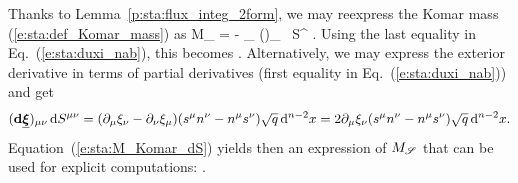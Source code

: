 Thanks to Lemma~\ref{p:sta:flux_integ_2form}, we may reexpress the Komar mass
(\ref{e:sta:def_Komar_mass}) as
\be \label{e:sta:M_Komar_dS}
   M_{\Sp} = -   \int_{\Sp} (\dd \uu{\xi})_{\mu\nu} \,  \D S^{\mu\nu} .
\ee
Using the last equality in Eq.~(\ref{e:sta:duxi_nab}), this becomes
\be \label{e:sta:Komar_mass_flux_nabla_xi}
     .
\ee
Alternatively, we may express the exterior derivative in terms of
partial derivatives (first equality in Eq.~(\ref{e:sta:duxi_nab})) and get
\[
    (\mathbf{d} \underline{\bm{\xi}})_{\mu\nu} \,  \mathrm{d} S^{\mu\nu} =
    (\partial_\mu \xi_\nu - \partial_\nu \xi_\mu)
    (s^\mu n^\nu - n^\mu s^\nu) \sqrt{q}\, \mathrm{d}^{n-2} x
    = 2 \partial_\mu \xi_\nu  (s^\mu  n^\nu - n^\mu  s^\nu)
    \sqrt{q}\, \mathrm{d}^{n-2} x  .
\]
Equation~(\ref{e:sta:M_Komar_dS}) yields then an expression of $M_{\mathscr{S}}$ that
can be used for explicit computations:
\be \label{e:sta:M_Komar_partial_der}
     .
\ee

